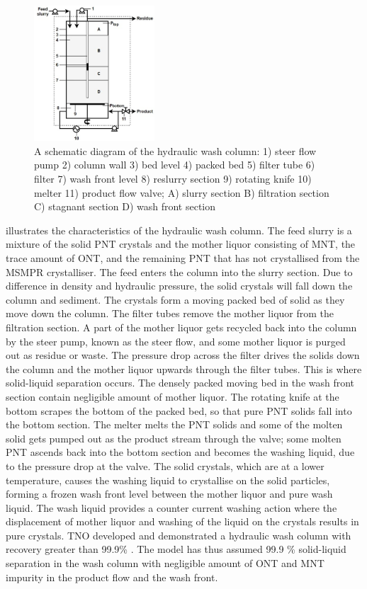 \begin{figure}
\centering
\includegraphics[width=0.4\textwidth]{chapters/3-separation/figures/hydraulic.jpg}
\caption{A schematic diagram of the hydraulic wash column: 1) steer flow pump 2) column wall 3) bed level 4) packed bed 5) filter tube 6) filter 7) wash front level 8) reslurry section 9) rotating knife 10) melter 11) product flow valve; A) slurry section B) filtration section C) stagnant section D) wash front section \cite{van_oord-knol_hydraulic_2000}}
\label{fig:hydraulic}
\end{figure}

 illustrates the characteristics of the hydraulic wash column. The feed slurry is a mixture of the solid PNT crystals and the mother liquor consisting of MNT, the trace amount of ONT, and the remaining PNT that has not crystallised from the MSMPR crystalliser. The feed enters the column into the slurry section. Due to difference in density and hydraulic pressure, the solid crystals will fall down the column and sediment. The crystals form a moving packed bed of solid as they  move down the column. The filter tubes remove the mother liquor from the filtration section. A part of the mother liquor gets recycled back into the column by the steer pump, known as the steer flow, and some mother liquor is purged out as residue or waste. The pressure drop across the filter drives the solids down the column and the mother liquor upwards through the filter tubes. This is where solid-liquid separation occurs. The densely packed moving bed in the wash front section contain negligible amount of mother liquor. The rotating knife at the bottom scrapes the bottom of the packed bed, so that pure PNT solids fall into the bottom section. The melter melts the PNT solids and some of the molten solid gets pumped out as the product stream through the valve; some molten PNT ascends back into the bottom section and becomes the washing liquid, due to the pressure drop at the valve. The solid crystals, which are at a lower temperature, causes the washing liquid to crystallise on the solid particles, forming a frozen wash front level between the mother liquor and pure wash liquid. The wash liquid provides a counter current washing action where the displacement of mother liquor and washing of the liquid on the crystals results in pure crystals. TNO developed and demonstrated a hydraulic wash column with recovery greater than 99.9\% \cite{bassett_melt_2021}. The model has thus assumed 99.9 \% solid-liquid separation in the wash column with negligible amount of ONT and MNT impurity in the product flow and the wash front.

